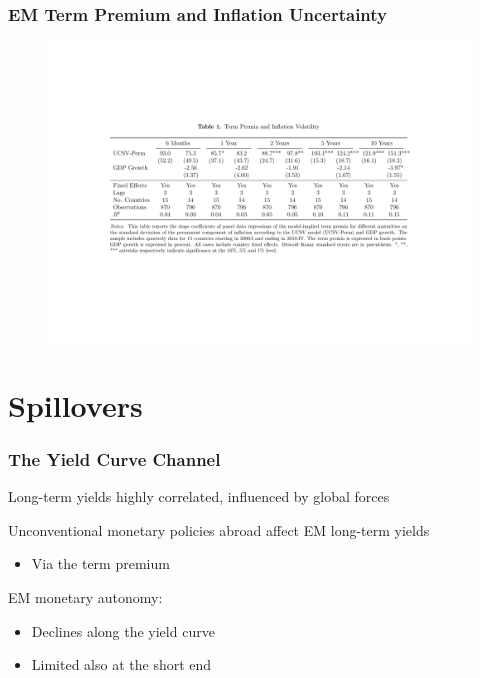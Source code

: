 \documentclass[12pt, aspectratio=169, xcolor=dvipsnames]{beamer}
\begin{document}
\begin{frame}
\frametitle{EM Term Premium and Inflation Uncertainty}
%	
\vspace{-0.8cm}
\begin{figure}[!htbp]
\begin{center} %
\includegraphics[trim={4cm 6cm 3cm 6.5cm},clip, width=1.05\textwidth,height=0.95\textheight]{../Tables/tpucsv.pdf}
\par\end{center}
\end{figure}
\end{frame}


\section{Spillovers}

\begin{frame}
\frametitle{The Yield Curve Channel}
Long-term yields highly correlated, influenced by global forces

Unconventional monetary policies abroad affect EM long-term yields
\begin{itemize}
	\item Via the term premium \citep{Turner:2014}
\end{itemize}

\alert{EM monetary autonomy}:
\begin{itemize}
	\item Declines along the yield curve \citep{Obstfeld:2015}
	\item Limited also at the short end \citep{Kalemli-Ozcan:2019}
\end{itemize}
\end{frame}
\end{document}
